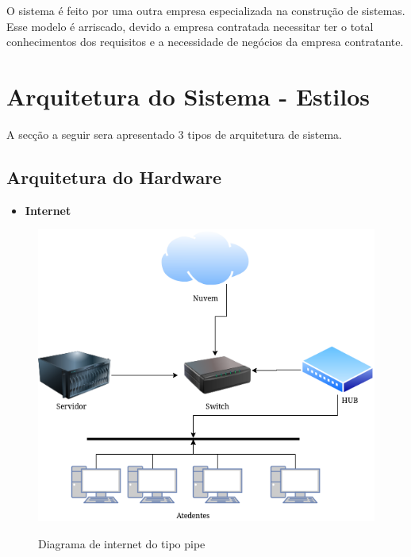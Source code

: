     O sistema é feito por uma outra  empresa especializada na construção de sistemas. Esse modelo é arriscado, devido a empresa contratada necessitar ter o total conhecimentos dos requisitos e a necessidade de negócios da empresa contratante.





\section{Arquitetura do Sistema - Estilos}
A secção a seguir sera apresentado 3 tipos de arquitetura de sistema.

    \subsection{Arquitetura do Hardware}
         \begin{itemize}
    \item \textbf{Internet}
  \end{itemize}
\begin{figure}[H]
              \begin{center}
                  \caption{Diagrama de internet do tipo pipe} \label{afp}
                  \includegraphics[width=15cm]{Pictures/DiagramaDeInternetTipoPipe.png} \\

              \end{center}
             \end{figure}
             
